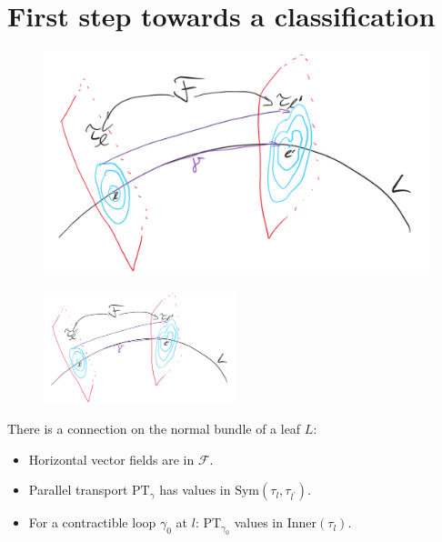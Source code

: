 \documentclass[
aspectratio=3218, 
10pt
]{beamer}
\theoremstyle{plain}
\theoremstyle{remark}
\begin{document}
\section{First step towards a classification}


\begin{frame}
\begin{figure}[htbp]
	\centering
		\includegraphics[width=1.00\textwidth]{Foliation connection.png}
	\label{fig:Foliationconnection}
\end{figure}

\end{frame}

\begin{frame}
\begin{figure}[htbp]
	\centering
		\includegraphics[width=0.50\textwidth]{Foliation connection.png}
	\label{fig:FoliationconnectionZwei}
\end{figure}

\begin{theorem}\vspace{.5pt}
There is a connection on the normal bundle of a leaf $L$:
\begin{itemize}
	\item Horizontal vector fields are in $\mathcal{F}$.
	\item Parallel transport $\mathup{PT}_\gamma$ has values in $\mathup{Sym}(\tau_l, \tau_{l^\prime})$.
	\item For a contractible loop $\gamma_0$ at $l$: $\mathup{PT}_{\gamma_0}$ values in $\mathup{Inner}(\tau_l)$.
\end{itemize}
\end{theorem}

\end{frame}
\end{document}
